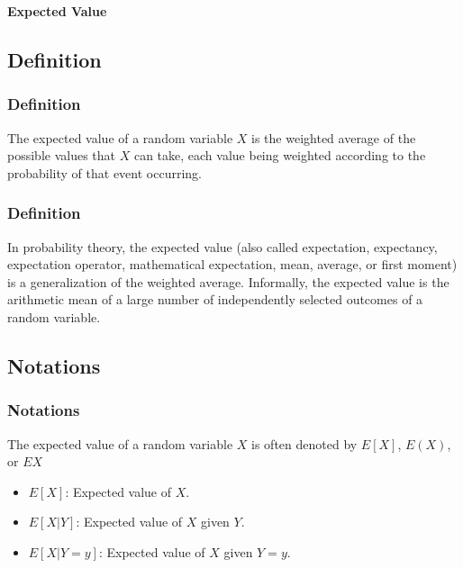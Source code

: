 \begin{frame}
    \Huge
    \begin{center}
        \textbf{Expected Value}
    \end{center}
\end{frame}

\subsection{Definition}\label{subsec:definition}
\begin{frame}
    \frametitle{Definition}
    \begin{block}{}
        The expected value of a random variable $X$ is the weighted average of the possible values that $X$ can take, each value being weighted according to the probability of that event occurring.
    \end{block}
\end{frame}
\begin{frame}
    \frametitle{Definition}
    \begin{block}{}
        In probability theory, the expected value (also called expectation, expectancy, expectation operator, mathematical expectation, mean, average, or first moment) is a generalization of the weighted average.
        Informally, the expected value is the arithmetic mean of a large number of independently selected outcomes of a random variable.
    \end{block}
\end{frame}

\subsection{Notations}\label{subsec:notations}
\begin{frame}
    \frametitle{Notations}
    \begin{block}{}
        The expected value of a random variable $X$ is often denoted by $E[X]$, $E(X)$, or $EX$
    \end{block}
    \begin{block}{}
        \begin{itemize}
            \item $E[X]$: Expected value of $X$.
            \item $E[X|Y]$: Expected value of $X$ given $Y$.
            \item $E[X|Y=y]$: Expected value of $X$ given $Y=y$.
        \end{itemize}
    \end{block}
\end{frame}

